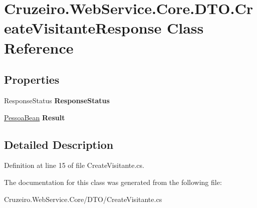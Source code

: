 \hypertarget{class_cruzeiro_1_1_web_service_1_1_core_1_1_d_t_o_1_1_create_visitante_response}{}\section{Cruzeiro.\+Web\+Service.\+Core.\+D\+T\+O.\+Create\+Visitante\+Response Class Reference}
\label{class_cruzeiro_1_1_web_service_1_1_core_1_1_d_t_o_1_1_create_visitante_response}
\subsection*{Properties}
\begin{DoxyCompactItemize}
\item 
Response\+Status {\bfseries Response\+Status}\hypertarget{class_cruzeiro_1_1_web_service_1_1_core_1_1_d_t_o_1_1_create_visitante_response_a12282628f1089559a920299fdb7845be}{}\label{class_cruzeiro_1_1_web_service_1_1_core_1_1_d_t_o_1_1_create_visitante_response_a12282628f1089559a920299fdb7845be}

\item 
\hyperlink{class_cruzeiro_1_1_core_1_1_model_1_1_beans_1_1_pessoa_bean}{Pessoa\+Bean} {\bfseries Result}\hypertarget{class_cruzeiro_1_1_web_service_1_1_core_1_1_d_t_o_1_1_create_visitante_response_ad59f73594b87a945723af7ca6b984e73}{}\label{class_cruzeiro_1_1_web_service_1_1_core_1_1_d_t_o_1_1_create_visitante_response_ad59f73594b87a945723af7ca6b984e73}

\end{DoxyCompactItemize}


\subsection{Detailed Description}


Definition at line 15 of file Create\+Visitante.\+cs.



The documentation for this class was generated from the following file\+:\begin{DoxyCompactItemize}
\item 
Cruzeiro.\+Web\+Service.\+Core/\+D\+T\+O/Create\+Visitante.\+cs\end{DoxyCompactItemize}

